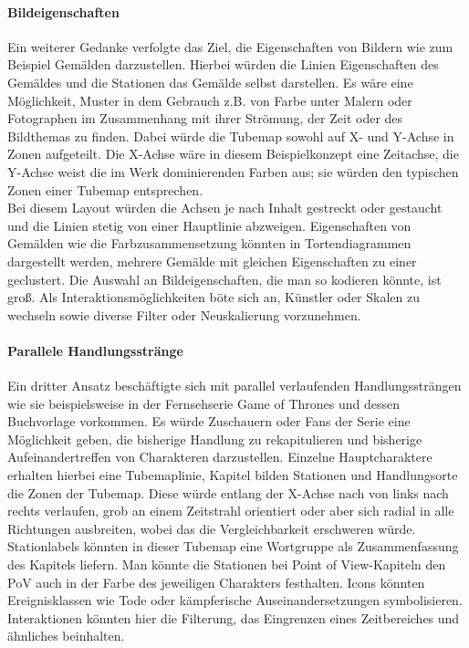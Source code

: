 \paragraph{Bildeigenschaften}
Ein weiterer Gedanke verfolgte das Ziel, die Eigenschaften von Bildern wie zum Beispiel Gemälden darzustellen. Hierbei würden die Linien Eigenschaften des Gemäldes und die Stationen das Gemälde selbst darstellen. Es wäre eine Möglichkeit, Muster in dem Gebrauch z.B. von Farbe unter Malern oder Fotographen im Zusammenhang mit ihrer Strömung, der Zeit oder des Bildthemas zu finden. Dabei würde die Tubemap sowohl auf X- und Y-Achse in Zonen aufgeteilt. Die X-Achse wäre in diesem Beispielkonzept eine Zeitachse, die Y-Achse weist die im Werk dominierenden Farben aus; sie würden den typischen Zonen einer Tubemap entsprechen. \\
Bei diesem Layout würden die Achsen je nach Inhalt gestreckt oder gestaucht und die Linien stetig von einer Hauptlinie abzweigen. Eigenschaften von Gemälden wie die Farbzusammensetzung könnten in Tortendiagrammen dargestellt werden, mehrere Gemälde mit gleichen Eigenschaften zu einer geclustert. Die Auswahl an Bildeigenschaften, die man so kodieren könnte, ist groß. Als Interaktionsmöglichkeiten böte sich an, Künstler oder Skalen zu wechseln sowie diverse Filter oder Neuskalierung vorzunehmen. 

\paragraph{Parallele Handlungsstränge}
Ein dritter Ansatz beschäftigte sich mit parallel verlaufenden Handlungssträngen wie sie beispielsweise in der Fernsehserie Game of Thrones und dessen Buchvorlage vorkommen. Es würde Zuschauern oder Fans der Serie eine Möglichkeit geben, die bisherige Handlung zu rekapitulieren und bisherige Aufeinandertreffen von Charakteren darzustellen. Einzelne Hauptcharaktere erhalten hierbei eine Tubemaplinie, Kapitel bilden Stationen und Handlungsorte die Zonen der Tubemap. Diese würde entlang der X-Achse nach von links nach rechts verlaufen, grob an einem Zeitstrahl orientiert oder aber sich radial in alle Richtungen ausbreiten, wobei das die Vergleichbarkeit erschweren würde. \\
Stationlabels könnten in dieser Tubemap eine Wortgruppe als Zusammenfassung des Kapitels liefern. Man könnte die Stationen bei Point of View-Kapiteln den PoV auch in der Farbe des jeweiligen Charakters festhalten. Icons könnten Ereignisklassen wie Tode oder kämpferische Auseinandersetzungen symbolisieren. Interaktionen könnten hier die Filterung, das Eingrenzen eines Zeitbereiches und ähnliches beinhalten. 


